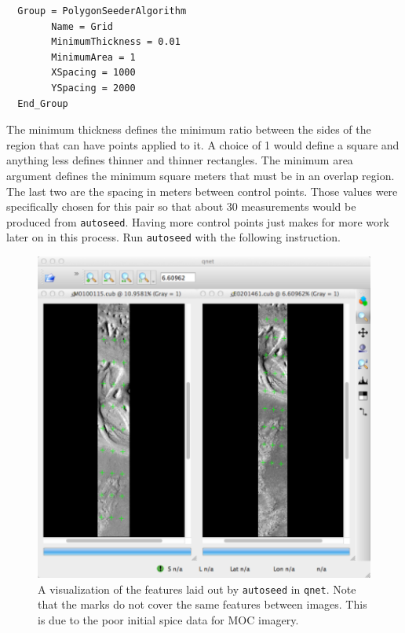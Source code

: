 \begin{verbatim}
  Group = PolygonSeederAlgorithm
        Name = Grid
        MinimumThickness = 0.01
        MinimumArea = 1
        XSpacing = 1000
        YSpacing = 2000
  End_Group
\end{verbatim}

The minimum thickness defines the minimum ratio between the sides of
the region that can have points applied to it. A choice of 1 would
define a square and anything less defines thinner and thinner
rectangles. The minimum area argument defines the minimum square
meters that must be in an overlap region. The last two are the spacing
in meters between control points. Those values were specifically
chosen for this pair so that about 30 measurements would be produced
from \texttt{autoseed}. Having more control points just makes for more
work later on in this process. Run \texttt{autoseed} with the
following instruction.

\begin{figure}[ht]
  \centering
  \includegraphics[width=5in]{images/qnet/Qnet_AfterAutoseed_400px.png}
  \caption{A visualization of the features laid out by
    \texttt{autoseed} in \texttt{qnet}. Note that the marks do not
    cover the same features between images. This is due to the poor
    initial spice data for MOC imagery.}
  \label{fig:after_autoseed}
\end{figure}

